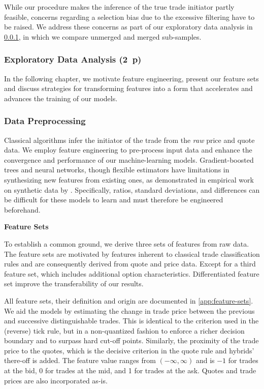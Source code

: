 While our procedure makes the inference of the true trade initiator partly feasible, concerns regarding a selection bias due to the excessive filtering have to be raised. We address these concerns as part of our exploratory data analysis in \cref{sec:exploratory-data-analysis}, in which we compare unmerged and merged sub-samples.

\subsubsection{Exploratory Data Analysis (2~p)}\label{sec:exploratory-data-analysis}

In the following chapter, we motivate feature engineering, present our feature sets and discuss strategies for transforming features into a form that accelerates and advances the training of our models.
\subsubsection{Data Preprocessing}\label{sec:data-preprocessing}

Classical algorithms infer the initiator of the trade from the \emph{raw} price and quote data. We employ feature engineering to pre-process input data and enhance the convergence and performance of our machine-learning models. Gradient-boosted trees and neural networks, though flexible estimators have limitations in synthesizing new features from existing ones, as demonstrated in empirical work on synthetic data by \textcite[][5--6]{heatonEmpiricalAnalysisFeature2016}. Specifically, ratios, standard deviations, and differences can be difficult for these models to learn and must therefore be engineered beforehand.

\textbf{Feature Sets}

To establish a common ground, we derive three sets of features from raw data. The feature sets are motivated by features inherent to classical trade classification rules and are consequently derived from quote and price data. Except for a third feature set, which includes additional option characteristics. Differentiated feature set improve the transferability of our results.

All feature sets, their definition and origin are documented in \cref{app:feature-sets}. We aid the models by estimating the change in trade price between the previous and successive distinguishable trades. This is identical to the criterion used in the (reverse) tick rule, but in a non-quantized fashion to enforce a richer decision boundary and to surpass hard cut-off points. Similarly, the proximity of the trade price to the quotes, which is the decisive criterion in the quote rule and hybrids' there-off is added. The feature value ranges from $\left(-\infty,\infty\right)$ and is $-1$ for trades at the bid, 0 for trades at the mid, and 1 for trades at the ask. Quotes and trade prices are also incorporated as-is.

